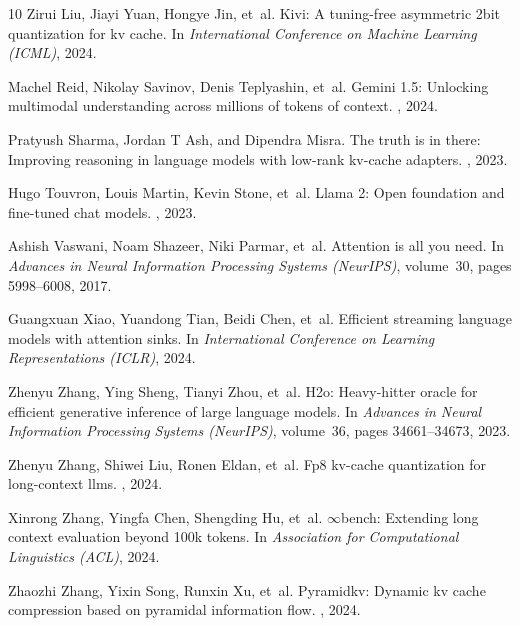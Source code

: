 \documentclass[11pt,a4paper]{article}
\begin{document}
\begin{thebibliography}{10}
Zirui Liu, Jiayi Yuan, Hongye Jin, et~al.
\newblock Kivi: A tuning-free asymmetric 2bit quantization for kv cache.
\newblock In {\em International Conference on Machine Learning (ICML)}, 2024.

Machel Reid, Nikolay Savinov, Denis Teplyashin, et~al.
\newblock Gemini 1.5: Unlocking multimodal understanding across millions of tokens of context.
, 2024.

Pratyush Sharma, Jordan T Ash, and Dipendra Misra.
\newblock The truth is in there: Improving reasoning in language models with low-rank kv-cache adapters.
, 2023.

Hugo Touvron, Louis Martin, Kevin Stone, et~al.
\newblock Llama 2: Open foundation and fine-tuned chat models.
, 2023.

Ashish Vaswani, Noam Shazeer, Niki Parmar, et~al.
\newblock Attention is all you need.
\newblock In {\em Advances in Neural Information Processing Systems (NeurIPS)}, volume~30, pages 5998--6008, 2017.

Guangxuan Xiao, Yuandong Tian, Beidi Chen, et~al.
\newblock Efficient streaming language models with attention sinks.
\newblock In {\em International Conference on Learning Representations (ICLR)}, 2024.

Zhenyu Zhang, Ying Sheng, Tianyi Zhou, et~al.
\newblock H2o: Heavy-hitter oracle for efficient generative inference of large language models.
\newblock In {\em Advances in Neural Information Processing Systems (NeurIPS)}, volume~36, pages 34661--34673, 2023.

Zhenyu Zhang, Shiwei Liu, Ronen Eldan, et~al.
\newblock Fp8 kv-cache quantization for long-context llms.
, 2024.

Xinrong Zhang, Yingfa Chen, Shengding Hu, et~al.
\newblock $\infty$bench: Extending long context evaluation beyond 100k tokens.
\newblock In {\em Association for Computational Linguistics (ACL)}, 2024.

Zhaozhi Zhang, Yixin Song, Runxin Xu, et~al.
\newblock Pyramidkv: Dynamic kv cache compression based on pyramidal information flow.
, 2024.

\end{thebibliography}
\endgroup
\end{document}
